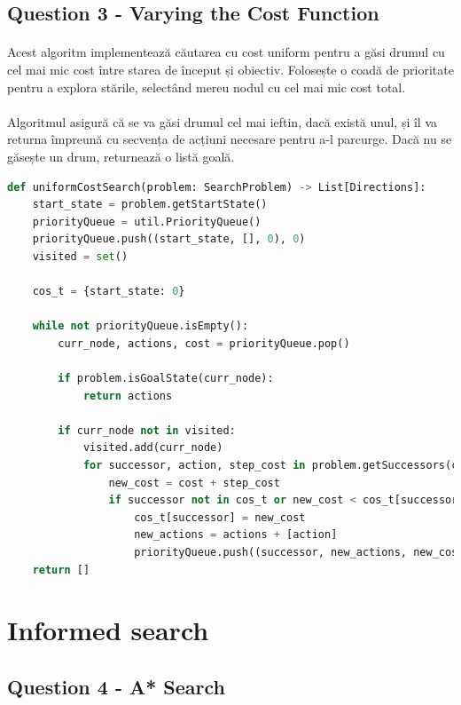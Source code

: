 \documentclass[12pt]{article}
\begin{document}
    \subsection{Question 3 - Varying the Cost Function}
    \paragraph{}Acest algoritm implementează căutarea cu cost uniform pentru a găsi drumul cu cel mai mic cost între starea de început și obiectiv. Folosește o coadă de prioritate pentru a explora stările, selectând mereu nodul cu cel mai mic cost total.
    \paragraph{} Algoritmul asigură că se va găsi drumul cel mai ieftin, dacă există unul, și îl va returna împreună cu secvența de acțiuni necesare pentru a-l parcurge. Dacă nu se găsește un drum, returnează o listă goală.

    \begin{lstlisting}[language=Python]
def uniformCostSearch(problem: SearchProblem) -> List[Directions]:
    start_state = problem.getStartState()
    priorityQueue = util.PriorityQueue()
    priorityQueue.push((start_state, [], 0), 0)
    visited = set()

    cos_t = {start_state: 0}

    while not priorityQueue.isEmpty():
        curr_node, actions, cost = priorityQueue.pop()

        if problem.isGoalState(curr_node):
            return actions

        if curr_node not in visited:
            visited.add(curr_node)
            for successor, action, step_cost in problem.getSuccessors(curr_node):
                new_cost = cost + step_cost
                if successor not in cos_t or new_cost < cos_t[successor]:
                    cos_t[successor] = new_cost
                    new_actions = actions + [action]
                    priorityQueue.push((successor, new_actions, new_cost), new_cost)
    return []
    \end{lstlisting}

\section{Informed search}
    \subsection{Question 4 - A* Search}
\end{document}
